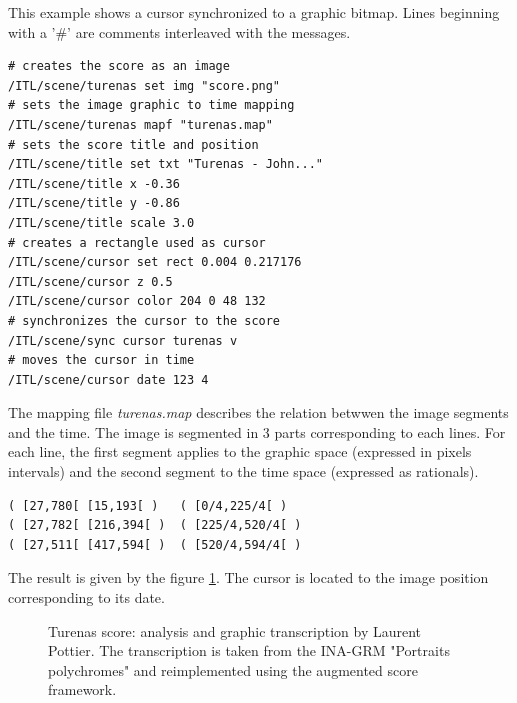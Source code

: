 \documentclass{article}
\begin{document}
This example shows a cursor synchronized to a graphic bitmap. Lines beginning with a '\#' are comments interleaved with the messages.
{\small \begin{verbatim}
# creates the score as an image
/ITL/scene/turenas set img "score.png"
# sets the image graphic to time mapping
/ITL/scene/turenas mapf "turenas.map"
# sets the score title and position
/ITL/scene/title set txt "Turenas - John..."
/ITL/scene/title x -0.36
/ITL/scene/title y -0.86
/ITL/scene/title scale 3.0
# creates a rectangle used as cursor
/ITL/scene/cursor set rect 0.004 0.217176
/ITL/scene/cursor z 0.5
/ITL/scene/cursor color 204 0 48 132
# synchronizes the cursor to the score
/ITL/scene/sync cursor turenas v
# moves the cursor in time
/ITL/scene/cursor date 123 4
\end{verbatim}

The mapping file \emph{turenas.map } describes the relation betwwen the image segments and the time. The image is segmented in 3 parts corresponding to each lines. For each line, the first segment applies to the graphic space (expressed in pixels intervals) and the second segment to the time space (expressed as rationals).

{\small \begin{verbatim}
( [27,780[ [15,193[ )   ( [0/4,225/4[ ) 
( [27,782[ [216,394[ )  ( [225/4,520/4[ )
( [27,511[ [417,594[ )  ( [520/4,594/4[ )
\end{verbatim}

The result is given by the figure \ref{fig:turenas}. The cursor is located to the image position corresponding to its date.

\begin{figure}[htbp]
\centerline{}
\caption{Turenas score: analysis and graphic transcription by Laurent Pottier. The transcription is taken from the INA-GRM "Portraits polychromes" and reimplemented using the augmented score framework.}
\label{fig:turenas}
\end{figure}


}}
\end{document}

